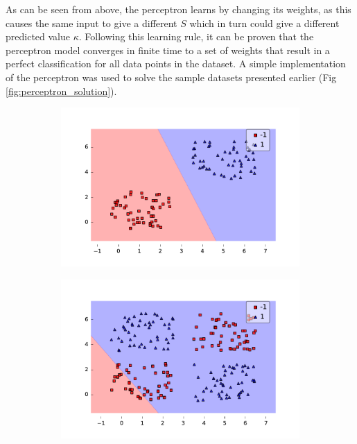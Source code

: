 As can be seen from above, the perceptron learns by changing its weights, as this causes the same input to give a different $S$ which in turn could give a different predicted value $\kappa$. Following this learning rule, it can be proven that the perceptron model converges in finite time to a set of weights that result in a perfect classification for all data points in the dataset. A simple implementation of the perceptron was used to solve the sample datasets presented earlier (Fig \ref{fig:perceptron_solution}).

\begin{figure}[!h]
  \centering
  \begin{subfigure}{.49\textwidth}
    \centering
    \includegraphics[width=\linewidth]{figures/perceptron_solvable.pdf}
  \end{subfigure} %
  \begin{subfigure}{0.49\textwidth}
    \centering
    \includegraphics[width=\linewidth]{figures/perceptron_non_solvable.pdf}

\end{subfigure}
\end{figure}
